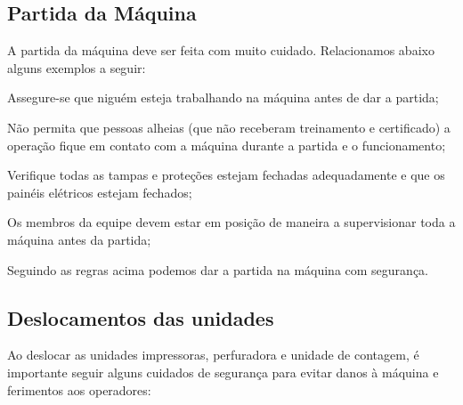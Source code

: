 \begin{generalSafetyRules}
\newpage
\thispagestyle{fancy}
\vspace*{40 pt}


\end{generalSafetyRules}
\subsection{Partida da Máquina}

A partida da máquina deve ser feita com muito cuidado. Relacionamos abaixo alguns exemplos a seguir:

\begin{generalSafetyToStartTheMachine}


    \item[\ding{\dingNumber}] Assegure-se que niguém esteja trabalhando na máquina antes de dar a partida;
    \item[\ding{\dingNumber}] Não permita que pessoas alheias (que não receberam treinamento e certificado) a operação fique em
contato com a máquina durante a partida e o funcionamento;
    \item[\ding{\dingNumber}] Verifique todas as tampas e proteções estejam fechadas adequadamente e que os painéis elétricos
estejam fechados;
    \item[\ding{\dingNumber}] Os membros da equipe devem estar em posição de maneira a supervisionar toda a máquina antes da
partida;
    \item[\ding{\dingNumber}] Seguindo as regras acima podemos dar a partida na máquina com segurança.

\end{generalSafetyToStartTheMachine}

\subsection{Deslocamentos das unidades}

Ao deslocar as unidades impressoras, perfuradora e unidade de contagem, é importante seguir alguns cuidados de segurança para evitar danos à máquina e ferimentos aos operadores:


